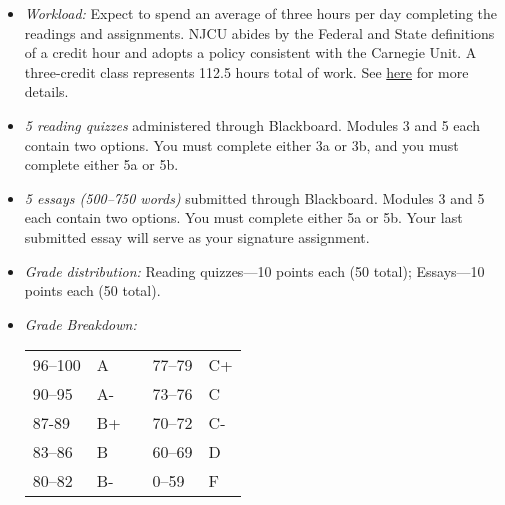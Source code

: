 \documentclass[article,oneside]{memoir}
\begin{document}
\begin{itemize}
\item \textit{Workload:} Expect to spend an average of three hours per day completing the readings and assignments. NJCU abides by the Federal and State definitions of a credit hour and adopts a policy consistent with the Carnegie Unit. A three-credit class represents 112.5 hours total of work. See \href{http://scottoconnor.org/resources/Credit.pdf}{here} for more details.


\item \textit{5 reading quizzes} administered through Blackboard. Modules 3 and 5 each contain two options. You must complete either 3a or 3b, and you must complete either 5a or 5b. %

\item \textit{5 essays (500--750 words)} submitted through Blackboard. Modules 3 and 5 each contain two options. You must complete either 5a or 5b. Your last submitted essay will serve as your signature assignment. %



  
\item \textit{Grade distribution:} Reading quizzes---10 points each (50 total);  Essays---10 points each (50 total).


\item \textit{Grade Breakdown:}

 \begin{tabular}{ | l | l | p{2cm} | l | l | }
    \hline 
96--100 & A  & &  77--79 &  C+ \\  
90--95 & A- & &  73--76 & C \\
87-89 & B+ &  &  70--72 & C- \\ 
83--86 & B  & &  60--69 & D\\
80--82 & B- & & 0--59 & F\\ \hline
    \end{tabular}


\end{itemize}
\end{document}

